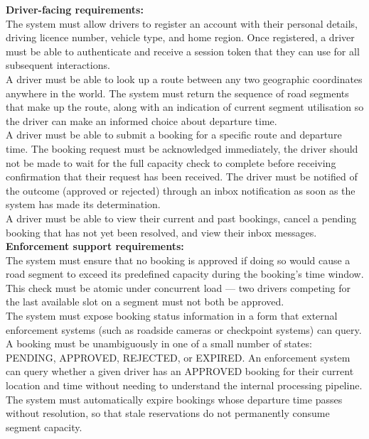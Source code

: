 \documentclass{article}
\begin{document}
\textbf{Driver-facing requirements:}\\
The system must allow drivers to register an account with their personal details, driving licence number, vehicle type, and home region. Once registered, a driver must be able to authenticate and receive a session token that they can use for all subsequent interactions.\\
A driver must be able to look up a route between any two geographic coordinates anywhere in the world. The system must return the sequence of road segments that make up the route, along with an indication of current segment utilisation so the driver can make an informed choice about departure time.\\
A driver must be able to submit a booking for a specific route and departure time. The booking request must be acknowledged immediately, the driver should not be made to wait for the full capacity check to complete before receiving confirmation that their request has been received. The driver must be notified of the outcome (approved or rejected) through an inbox notification as soon as the system has made its determination.\\
A driver must be able to view their current and past bookings, cancel a pending booking that has not yet been resolved, and view their inbox messages.\\

\textbf{Enforcement support requirements:}\\
The system must ensure that no booking is approved if doing so would cause a road segment to exceed its predefined capacity during the booking's time window. This check must be atomic under concurrent load — two drivers competing for the last available slot on a segment must not both be approved.\\
The system must expose booking status information in a form that external enforcement systems (such as roadside cameras or checkpoint systems) can query. A booking must be unambiguously in one of a small number of states: PENDING, APPROVED, REJECTED, or EXPIRED. An enforcement system can query whether a given driver has an APPROVED booking for their current location and time without needing to understand the internal processing pipeline.\\
The system must automatically expire bookings whose departure time passes without resolution, so that stale reservations do not permanently consume segment capacity.
\end{document}
